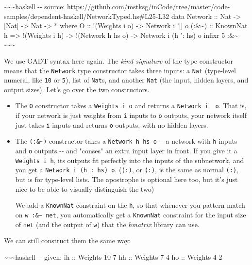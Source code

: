 \documentclass[]{article}
\begin{document}
\textasciitilde{}\textasciitilde{}\textasciitilde{}haskell -\/- source:
https://github.com/mstksg/inCode/tree/master/code-samples/dependent-haskell/NetworkTyped.hs\#L25-L32
data Network :: Nat -\textgreater{} {[}Nat{]} -\textgreater{} Nat
-\textgreater{} * where O :: !(Weights i o) -\textgreater{} Network i '{[}{]} o
(:\&\textasciitilde{}) :: KnownNat h =\textgreater{} !(Weights i h)
-\textgreater{} !(Network h hs o) -\textgreater{} Network i (h ': hs) o infixr 5
:\&\textasciitilde{} \textasciitilde{}\textasciitilde{}\textasciitilde{}

We use GADT syntax here again. The \emph{kind signature} of the type constructor
means that the \texttt{Network} type constructor takes three inputs: a
\texttt{Nat} (type-level numeral, like \texttt{10} or \texttt{5}), list of
\texttt{Nat}s, and another \texttt{Nat} (the input, hidden layers, and output
sizes). Let's go over the two constructors.

\begin{itemize}
\item
  The \texttt{O} constructor takes a \texttt{Weights\ i\ o} and returns a
  \texttt{Network\ i\ \textquotesingle{}{[}{]}\ o}. That is, if your network is
  just weights from \texttt{i} inputs to \texttt{o} outputs, your network itself
  just takes \texttt{i} inputs and returns \texttt{o} outputs, with no hidden
  layers.
\item
  The \texttt{(:\&\textasciitilde{})} constructor takes a
  \texttt{Network\ h\ hs\ o} -\/- a network with \texttt{h} inputs and
  \texttt{o} outputs -\/- and "conses" an extra input layer in front. If you
  give it a \texttt{Weights\ i\ h}, its outputs fit perfectly into the inputs of
  the subnetwork, and you get a
  \texttt{Network\ i\ (h\ \textquotesingle{}:\ hs)\ o}.
  (\texttt{(\textquotesingle{}:)}, or \texttt{(:)}, is the same as normal
  \texttt{(:)}, but is for type-level lists. The apostrophe is optional here
  too, but it's just nice to be able to visually distinguish the two)

  We add a \texttt{KnownNat} constraint on the \texttt{h}, so that whenever you
  pattern match on \texttt{w\ :\&\textasciitilde{}\ net}, you automatically get
  a \texttt{KnownNat} constraint for the input size of \texttt{net} (and the
  output of \texttt{w}) that the \emph{hmatrix} library can use.
\end{itemize}

We can still construct them the same way:

\textasciitilde{}\textasciitilde{}\textasciitilde{}haskell -\/- given: ih ::
Weights 10 7 hh :: Weights 7 4 ho :: Weights 4 2
\end{document}
